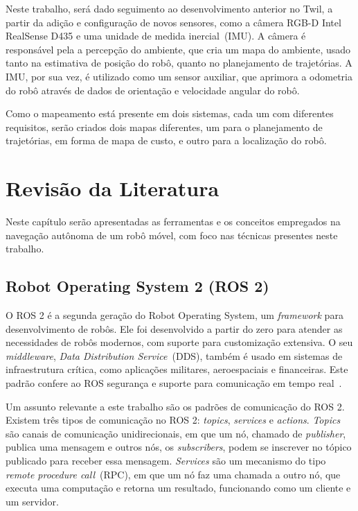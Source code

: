 \documentclass[repeatfields,xlists,xpacks,oneside,yearsonly]{ufrgscca}
\begin{document}
Neste trabalho, será dado seguimento ao desenvolvimento anterior no
Twil, a partir da adição e configuração de novos sensores, como a
câmera RGB-D Intel RealSense D435 e uma unidade de medida
inercial~(IMU). A câmera é responsável pela a percepção do ambiente,
que cria um mapa do ambiente, usado tanto na estimativa de posição do
robô, quanto no planejamento de trajetórias. A IMU, por sua vez, é
utilizado como um sensor auxiliar, que aprimora a odometria do robô
através de dados de orientação e velocidade angular do robô.

Como o mapeamento está presente em dois sistemas, cada um com
diferentes requisitos, serão criados dois mapas diferentes, um para o
planejamento de trajetórias, em forma de mapa de custo, e outro para
a localização do robô.

\chapter{Revisão da Literatura}
\label{revisao}

Neste capítulo serão apresentadas as ferramentas e os conceitos
empregados na navegação autônoma de um robô móvel, com foco nas
técnicas presentes neste trabalho.

\section{Robot Operating System 2 (ROS 2)}

O ROS 2 é a segunda geração do Robot Operating System, um
\textit{framework} para desenvolvimento de robôs. Ele foi
desenvolvido a partir do zero para atender as necessidades de robôs
modernos, com suporte para customização extensiva. O seu
\textit{middleware}, \textit{Data Distribution Service}~(DDS), também
é usado em sistemas de infraestrutura crítica, como aplicações
militares, aeroespaciais e financeiras. Este padrão confere ao ROS
segurança e suporte para comunicação em tempo
real~\cite{ROS2Article}.

Um assunto relevante a este trabalho são os padrões de comunicação do
ROS 2. Existem três tipos de comunicação no ROS 2: \textit{topics},
\textit{services} e \textit{actions}. \textit{Topics} são canais de
comunicação unidirecionais, em que um nó, chamado de
\textit{publisher}, publica uma mensagem e outros nós, os
\textit{subscribers}, podem se inscrever no tópico publicado para
receber essa mensagem. \textit{Services} são um mecanismo do tipo
\textit{remote procedure call}~(RPC), em que um nó faz uma chamada a
outro nó, que executa uma computação e retorna um resultado,
funcionando como um cliente e um servidor.
\end{document}
